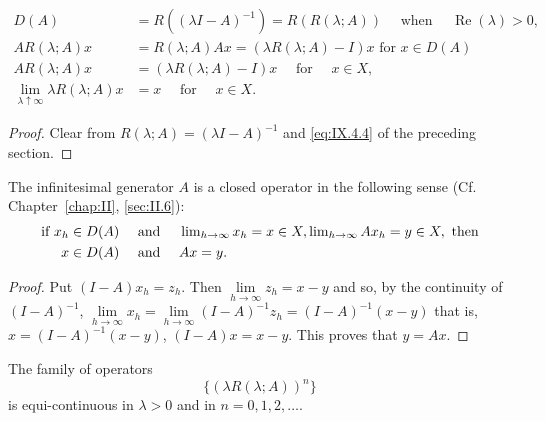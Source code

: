 \begin{corollary}\label{cor:IX.4.Corollary.2} 
\begin{align}
D (A)& = R ((\lambda I - A) ^{-1}) = R (R (\lambda ; A)) \quad \text{ when } \quad \operatorname{Re} (\lambda) > 0, \label{eq:IX.4.3} \\
A R (\lambda ; A) x& = R (\lambda ; A) A x = (\lambda R (\lambda ; A) - I) x \text{ for } x \in D (A) \label{eq:IX.4.4} \\
A R (\lambda ; A) x& = (\lambda R (\lambda ; A) - I) x \quad \text{ for } \quad x \in X, \label{eq:IX.4.5} \\
\lim\limits _{\lambda \uparrow \infty} \lambda R (\lambda ; A) x& = x \quad \text{ for } \quad x \in X. \label{eq:IX.4.6}
\end{align}
\end{corollary}

\begin{proof}
 Clear from $R(\lambda; A) = (\lambda I - A)^{-1}$ and \eqref{eq:IX.4.4} of the preceding section. 
\end{proof}

\begin{corollary}\label{cor:IX.4.Corollary.3} The infinitesimal generator $A$ is a closed operator in the following sense (Cf. Chapter~\ref{chap:II}, \ref{sec:II.6}): 
\begin{align}
\text{ if } x _{h}& \in D (A) \quad \text{ and } \quad \lim\limits _{h \to \infty} x _{h} = x \in X, \lim\limits _{h \to \infty} A x _{h} = y \in X, \text{ then } \notag \\
x& \in D (A) \quad \text{ and } \quad A x = y. \notag
\end{align}
\end{corollary}

\begin{proof}
 Put $(I - A)x_{h} = z_{h}$. Then $\lim\limits_{h\to \infty}z_h = x - y$ and so, by the continuity of $(I - A)^{-1}$, $\lim\limits_{h\to \infty}x_h = \lim\limits_{h\to \infty}(I - A)^{-1}z_h = (I - A)^{-1}(x - y)$ that is, $x = (I - A)^{-1}(x - y)$, $(I - A)x = x - y$. This proves that $y = Ax$. 
\end{proof}

\begin{theorem}\label{thm:IX.4.Theorem.2} The family of operators 
\begin{equation}\label{eq:IX.4.7}
\{(\lambda R (\lambda ; A)) ^{n} \}
\end{equation}
is equi-continuous in $\lambda > 0$ and in $n = 0, 1, 2, \ldots$. 
\end{theorem}

